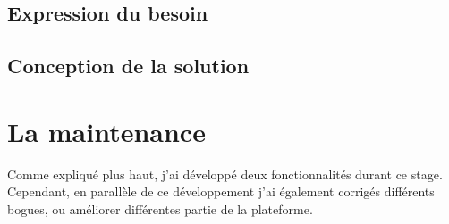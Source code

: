 \subsection{Expression du besoin}\label{besoinTab}
%
%
\subsection{Conception de la solution}


\section{La maintenance}
Comme expliqué plus haut, j'ai développé deux fonctionnalités durant ce stage. Cependant, en parallèle de ce développement j'ai également corrigés différents bogues, ou améliorer différentes partie de la plateforme.

